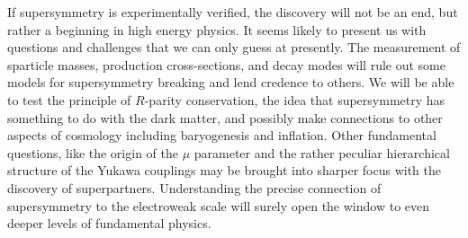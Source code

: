\documentclass[11pt]{article}
\begin{document}
If supersymmetry is experimentally verified, the discovery will not be 
an end, but rather a beginning in high energy physics. It seems likely 
to present us with questions and challenges that we can only guess at 
presently. The measurement of sparticle masses, production 
cross-sections, and decay modes will rule out some models for 
supersymmetry breaking and lend credence to others. We will be able to 
test the principle of $R$-parity conservation, the idea that 
supersymmetry has something to do with the dark matter, and possibly 
make connections to other aspects of cosmology including baryogenesis 
and inflation. Other fundamental questions, like the origin of the $\mu$ 
parameter and the rather peculiar hierarchical structure of the Yukawa 
couplings may be brought into sharper focus with the discovery of 
superpartners. Understanding the precise connection of supersymmetry to 
the electroweak scale will surely open the window to even deeper levels 
of fundamental physics.


\end{document}
